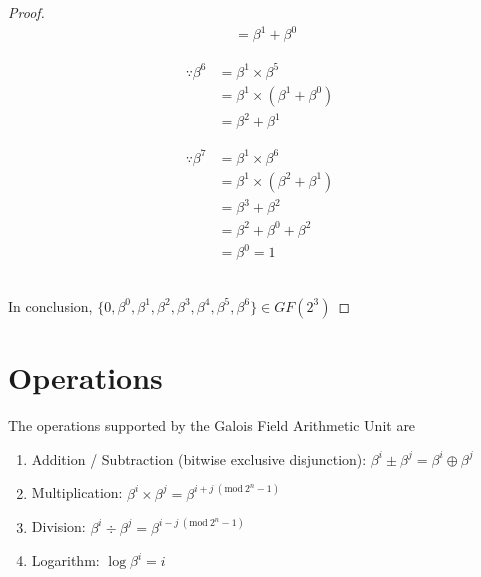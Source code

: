 \documentclass[12pt]{extarticle}
\newcommand{\Mod}[1]{\ (\mathrm{mod}\ #1)}
\begin{document}
\begin{proof}
\begin{minipage}[t]{0.5\textwidth}
\begin{equation*}
\begin{split}
                        & = \beta^{1}+\beta^{0}
                    \end{split}
                \end{equation*}
            \end{minipage}
            \begin{minipage}[t]{0.5\textwidth}
                \begin{equation*}
                    \begin{split}
                        \because \beta^{6} & = \beta^{1} \times \beta^{5} \\
                        & = \beta^{1} \times(\beta^{1}+\beta^{0}) \\
                        & = \beta^{2}+\beta^{1}
                    \end{split}
                \end{equation*}
            \end{minipage}
            \begin{minipage}[t]{0.5\textwidth}
                \begin{equation*}
                    \begin{split}
                        \because \beta^{7} & = \beta^{1} \times \beta^{6} \\
                        & = \beta^{1} \times(\beta^{2}+\beta^{1}) \\
                        & = \beta^{3}+\beta^{2} \\
                        & = \beta^{2}+\beta^{0}+\beta^{2} \\
                        & = \beta^{0} = 1
                    \end{split}
                \end{equation*}
            \end{minipage} \\

            In conclusion, $\{0, \beta^{0}, \beta^{1}, \beta^{2}, \beta^{3}, \beta^{4}, \beta^{5}, \beta^{6}\} \in GF(2^{3})$ \qedhere

        \end{proof}

    \section{Operations} The operations supported by the Galois Field
    Arithmetic Unit are
    \begin{enumerate}[label=\textbf{(\alph*)},itemsep=1em]
        \item Addition / Subtraction (bitwise exclusive disjunction): $\beta^{i} \pm \beta^{j} = \beta^{i} \oplus \beta^{j}$
        \item Multiplication: $\beta^{i} \times \beta^{j} = \beta^{i+j \Mod{2^n-1}}$
        \item Division: $\beta^{i} \div \beta^{j} = \beta^{i-j \Mod{2^n-1}}$
        \item Logarithm: $\log\beta^{i} = i$
    \end{enumerate}
\end{document}

